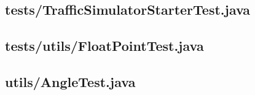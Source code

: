\subsection{tests/TrafficSimulatorStarterTest.java}

\newpage
\subsection{tests/utils/FloatPointTest.java}

\newpage
\subsection{utils/AngleTest.java}

